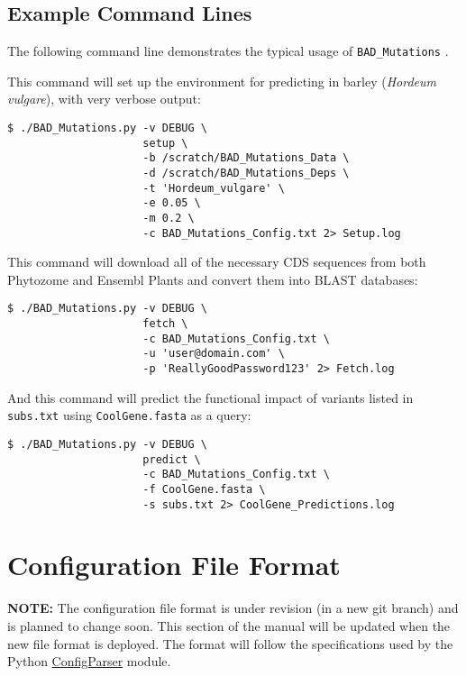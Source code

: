 \documentclass[12pt]{article}
\newcommand{\BM}{\texttt{BAD\_Mutations} }
\begin{document}
\subsection*{Example Command Lines}
\par The following command line demonstrates the typical usage of \BM.

\par This command will set up the environment for predicting in barley
(\textit{Hordeum vulgare}), with very verbose output:
\begin{Verbatim}[frame=single, fontsize=\small, rulecolor=\color{gray}]
$ ./BAD_Mutations.py -v DEBUG \
                     setup \
                     -b /scratch/BAD_Mutations_Data \
                     -d /scratch/BAD_Mutations_Deps \
                     -t 'Hordeum_vulgare' \
                     -e 0.05 \
                     -m 0.2 \
                     -c BAD_Mutations_Config.txt 2> Setup.log
\end{Verbatim}

\par This command will download all of the necessary CDS sequences from both
Phytozome and Ensembl Plants and convert them into BLAST databases:
\begin{Verbatim}[frame=single, fontsize=\small, rulecolor=\color{gray}]
$ ./BAD_Mutations.py -v DEBUG \
                     fetch \
                     -c BAD_Mutations_Config.txt \
                     -u 'user@domain.com' \
                     -p 'ReallyGoodPassword123' 2> Fetch.log
\end{Verbatim}

\par And this command will predict the functional impact of variants listed in
\texttt{subs.txt} using \texttt{CoolGene.fasta} as a query:
\begin{Verbatim}[frame=single, fontsize=\small, rulecolor=\color{gray}]
$ ./BAD_Mutations.py -v DEBUG \
                     predict \
                     -c BAD_Mutations_Config.txt \
                     -f CoolGene.fasta \
                     -s subs.txt 2> CoolGene_Predictions.log
\end{Verbatim}

\section*{Configuration File Format}
\par\textbf{NOTE:} The configuration file format is under revision (in a new
git branch) and is planned to change soon. This section of the manual will be
updated when the new file format is deployed. The format will follow the
specifications used by the Python 
\href{https://docs.python.org/2/library/configparser.html}{ConfigParser}
module.
\end{document}
